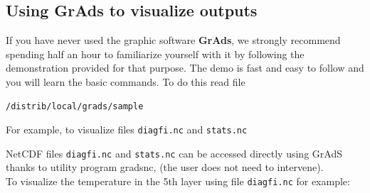 \subsection{Using GrAds to visualize outputs}
If you have never used the graphic software {\bf GrAds}, we strongly
recommend spending half an hour to familiarize yourself with it by following
the demonstration provided for that purpose.
The demo is fast and easy to follow and you will learn the basic commands.
To do this read file 
\begin{verbatim}
/distrib/local/grads/sample
\end{verbatim}

For example, to visualize files {\tt diagfi.nc} and {\tt stats.nc}

NetCDF files {\tt diagfi.nc} and {\tt stats.nc} can be accessed directly
using GrAdS thanks to utility program gradsnc,
(the user does not need to intervene).\\

\noindent
To visualize the temperature in the 5th layer using file
{\tt diagfi.nc} for example:
\label{loc:visu}

